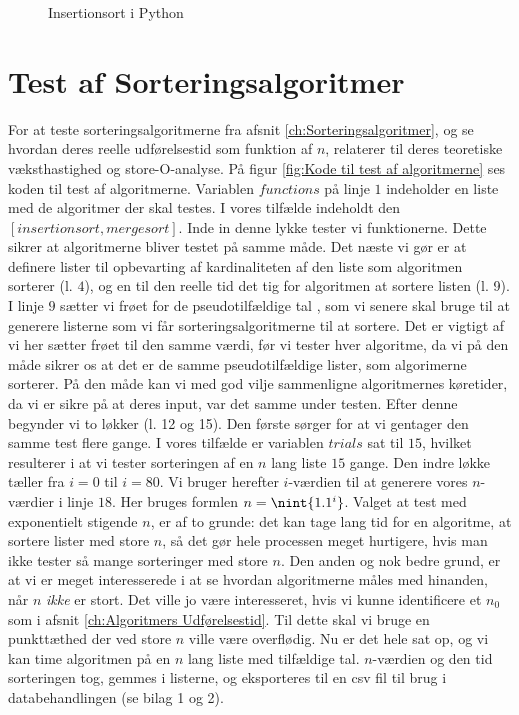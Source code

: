 \begin{figure}
	\begin{center}
		
	\end{center}
	\caption{Insertionsort i Python}
	\label{fig:Insertionsort i Python}
\end{figure}

\section{Test af Sorteringsalgoritmer}
\label{sec:Kode til Test af Sorteringsalgoritmer}

For at teste sorteringsalgoritmerne fra afsnit \ref{ch:Sorteringsalgoritmer}, og se hvordan deres reelle udførelsestid som funktion af $n$, relaterer til deres teoretiske væksthastighed og store-O-analyse. På figur \ref{fig:Kode til test af algoritmerne} ses koden til test af algoritmerne. Variablen $functions$ på linje $1$ indeholder en liste med de algoritmer der skal testes. I vores tilfælde indeholdt den $[insertionsort,mergesort]$. Inde in denne lykke tester vi funktionerne. Dette sikrer at algoritmerne bliver testet på samme måde. Det næste vi gør er at definere lister til opbevarting af kardinaliteten af den liste som algoritmen sorterer (l. $4$), og en til den reelle tid det tig for algoritmen at sortere listen (l. 9).  I linje $9$ sætter vi frøet for de pseudotilfældige tal \cite{python-random}, som vi senere skal bruge til at generere listerne som vi får sorteringsalgoritmerne til at sortere. Det er vigtigt af vi her sætter frøet til den samme værdi, før vi tester hver algoritme, da vi på den måde sikrer os at det er de samme pseudotilfældige lister, som algorimerne sorterer. På den måde kan vi med god vilje sammenligne algoritmernes køretider, da vi er sikre på at deres input, var det samme under testen. Efter denne  begynder vi to løkker (l. 12 og 15). Den første sørger for at vi gentager den samme test flere gange. I vores tilfælde er variablen $trials$ sat til $15$, hvilket resulterer i at vi tester sorteringen af en $n$ lang liste $15$ gange. Den indre løkke tæller fra $i=0$ til $i=80$. Vi bruger herefter $i$-værdien til at generere vores $n$-værdier i linje $18$. Her bruges formlen $n=\nint{1.1^i}$. Valget at test med exponentielt stigende $n$, er af to grunde: det kan tage lang tid for en algoritme, at sortere lister med store $n$, så det gør hele processen meget hurtigere, hvis man ikke tester så mange sorteringer med store $n$. Den anden og nok bedre grund, er at vi er meget interesserede i at se hvordan algoritmerne måles med hinanden, når $n$ \emph{ikke} er stort. Det ville jo være interesseret, hvis vi kunne identificere et $n_0$ som i afsnit \ref{ch:Algoritmers Udførelsestid}. Til dette skal vi bruge en punkttæthed der ved store $n$ ville være overflødig. Nu er det hele sat op, og vi kan time algoritmen på en $n$ lang liste med tilfældige tal. $n$-værdien og den tid sorteringen tog, gemmes i listerne, og eksporteres til en csv fil til brug i databehandlingen (se bilag 1 og 2).



